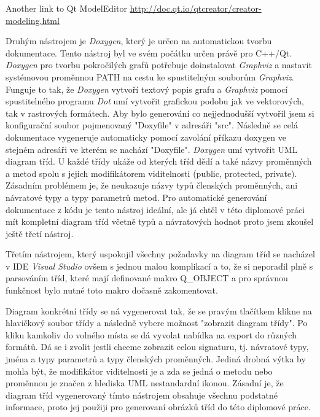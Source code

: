 Another link to Qt ModelEditor \url{http://doc.qt.io/qtcreator/creator-modeling.html}


Druhým nástrojem je \textit{Doxygen}, který je určen na automatickou tvorbu dokumentace. Tento nástroj byl ve svém počátku určen právě pro C++/Qt. \textit{Doxygen} pro tvorbu pokročilých grafů potřebuje doinstalovat \textit{Graphviz} a nastavit systémovou proměnnou PATH na cestu ke spustitelným souborům \textit{Graphviz}. Funguje to tak, že \textit{Doxygen} vytvoří textový popis grafu a \textit{Graphviz} pomocí spustitelného programu \textit{Dot} umí vytvořit grafickou podobu jak ve vektorových, tak v rastrových formátech. Aby bylo generování co nejjednodušší vytvořil jsem si konfigurační soubor pojmenovaný "Doxyfile" v adresáři "src". Následně se celá dokumentace vygeneruje automaticky pomocí zavolání příkazu doxygen ve stejném adresáři ve kterém se nachází "Doxyfile". \textit{Doxygen} umí vytvořit UML diagram tříd. U každé třídy ukáže od kterých tříd dědí a také názvy proměnných a metod spolu s jejich modifikátorem viditelnosti (public, protected, private). Zásadním problémem je, že neukazuje názvy typů členských proměnných, ani návratové typy a typy parametrů metod. 
Pro automatické generování dokumentace z kódu je tento nástroj ideální, ale já chtěl v této diplomové práci mít kompletní diagram tříd včetně typů a návratových hodnot proto jsem zkoušel ještě třetí nástroj.


Třetím nástrojem, který uspokojil všechny požadavky na diagram tříd se nacházel v IDE \textit{Visual Studio} ovšem s jednou malou komplikací a to, že si neporaďil plně s parsováním tříd, které mají definované makro Q\_OBJECT a pro správnou funkčnost bylo nutné toto makro dočasně zakomentovat. 

Diagram konkrétní třídy se ná vygenerovat tak, že se pravým tlačítkem klikne na hlavičkový soubor třídy a následně vybere možnost "zobrazit diagram třídy". Po kliku kamkoliv do volného místa se dá vyvolat nabídka na export do různých formátů. Dá se i zvolit jestli chceme zobrazit celou signaturu, tj. návratové typy, jména a typy parametrů a typy členských proměnných. Jediná drobná výtka by mohla být, že modifikátor viditelnosti je a zda se jedná o metodu nebo proměnnou je značen z hlediska UML nestandardní ikonou. Zásadní je, že diagram tříd vygenerovaný tímto nástrojem obsahuje všechnu podstatné informace, proto jej použiji pro generovaní obrázků tříd do této diplomové práce.


